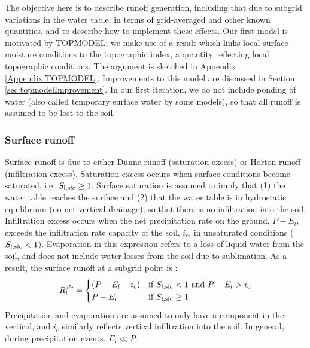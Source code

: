 \documentclass[twoside,10pt]{report}
\begin{document}



The objective here is to describe runoff generation, including that due to subgrid variations in the water table, in terms of grid-averaged and other known quantities, and to describe how to implement these effects. Our first model is motivated by TOPMODEL; we make use of a result which links local surface moisture conditions to the topographic index, a quantity reflecting local topographic conditions. The argument is sketched in Appendix \ref{Appendix:TOPMODEL}. Improvements to this model are discussed in Section \ref{sec:topmodelImprovement}.  In our first iteration, we do not include ponding of water (also called temporary surface water by some models), so that all runoff is assumed to be lost to the soil.

\subsubsection{Surface runoff}
Surface runoff is due to either Dunne runoff (saturation excess) or Horton runoff (infiltration excess). Saturation excess occurs when surface conditions become saturated, i.e. $S_{\rm l, sfc} \ge 1$. Surface saturation is assumed to imply that (1) the water table reaches the surface and (2) that the water table is in hydrostatic equilibrium (no net vertical drainage), so that there is no infiltration into the soil. Infiltration excess occurs when the net precipitation rate on the ground, $P-E_l$, exceeds the infiltration rate capacity of the soil, $i_c$, in unsaturated conditions ($S_{\rm l, sfc} < 1$). Evaporation in this expression refers to a loss of liquid water from the soil, and does not include water losses from the soil due to sublimation. As a result, the surface runoff at a subgrid point is \citep{Entekhabi89}:
 \begin{equation}
    R_l^{\rm sfc} = 
    \begin{cases}
        (P-E_l-i_c) & \text{if } S_{\rm l, sfc} < 1 \text{ and } P-E_l >i_c \\
        P-E_l       & \text{if } S_{\rm l, sfc} \ge 1 
    \end{cases}
    \label{Surface_runoff_cases}
\end{equation}
Precipitation and evaporation are assumed to only have a component in the vertical, and $i_c$ similarly reflects vertical infiltration into the soil. In general, during precipitation events, $E_l \ll P$. 
\end{document}
